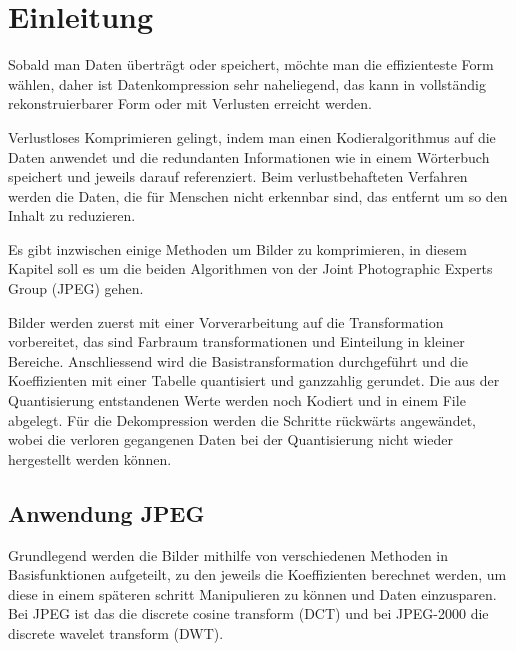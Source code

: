 %
%
%
%
\section{Einleitung\label{jpeg:section:einleitung}}
Sobald man Daten überträgt oder speichert, möchte man die effizienteste Form wählen, daher ist Datenkompression sehr naheliegend, das kann in vollständig rekonstruierbarer Form oder mit Verlusten erreicht werden.

Verlustloses Komprimieren gelingt, indem man einen Kodieralgorithmus auf die Daten anwendet und die redundanten Informationen wie in einem Wörterbuch speichert und jeweils darauf referenziert. Beim verlustbehafteten Verfahren werden die Daten, die für Menschen nicht erkennbar sind, das entfernt um so den Inhalt zu reduzieren.

Es gibt inzwischen einige Methoden um Bilder zu komprimieren, in diesem Kapitel soll es um die beiden Algorithmen von der Joint Photographic Experts Group (JPEG) gehen.

Bilder werden zuerst mit einer Vorverarbeitung auf die Transformation vorbereitet, das sind Farbraum transformationen und Einteilung in kleiner Bereiche.
Anschliessend wird die Basistransformation durchgeführt und die Koeffizienten mit einer Tabelle quantisiert und ganzzahlig gerundet.
Die aus der Quantisierung entstandenen Werte werden noch Kodiert und in einem File abgelegt.
Für die Dekompression werden die Schritte rückwärts angewändet, wobei die verloren gegangenen Daten bei der Quantisierung nicht wieder hergestellt werden können. 

\subsection{Anwendung JPEG\label{jpeg:subsection:anwendung}}
Grundlegend werden die Bilder mithilfe von verschiedenen Methoden in Basisfunktionen aufgeteilt, zu den jeweils die Koeffizienten berechnet werden, um diese in einem späteren schritt Manipulieren zu können und Daten einzusparen. 
Bei JPEG ist das die discrete cosine transform (DCT) und bei JPEG-2000 die discrete wavelet transform (DWT).
